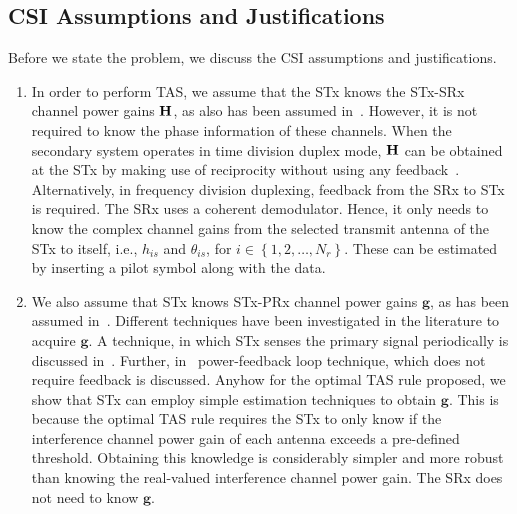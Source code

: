 \documentclass[12pt,draftcls,peerreview,onecolumn]{IEEEtran}
\newcommand{\ie}{{i.e.}}
\newcommand{\mtx}[1]{{\bf #1}} %
\newcommand{\Nr}{{N_r}}
\newcommand{\such}{h}
\newcommand{\puch}{g}
\newcommand{\hk}[1]{{\such_{#1}}}
\newcommand{\g}{\mathbf{\puch}}
\newcommand{\nropts}{\left\{1,2,\ldots,\Nr\right\}}
\newcommand{\suchph}{\theta}
\newcommand{\thetahk}{\suchph_{is}}
\newcommand{\Hmx}{\mtx{H}}
\begin{document}
\subsection{CSI Assumptions and Justifications}  
Before we state the problem, we discuss the  CSI assumptions and justifications. 
\begin{enumerate}
\item In order to perform TAS, we assume that the STx knows the STx-SRx channel power gains $\Hmx$, as also has been assumed in~\cite{XKang_2011_JSAC,Hanif_2015_globecom,Sarvendranath_2013_TCOM,Kong_2011_JCN,Asaduzzaman_2010_IET,Kang_2008_ICC,Wang_2010_TWC,RZhang_2009_TWC}. However, it is not required to know the phase information of these channels. When the secondary system operates in time division duplex mode, $\Hmx$ can be obtained at the STx by making use of reciprocity without using any feedback~\cite{Sarvendranath_2013_TCOM}. Alternatively, in frequency division duplexing, feedback from the SRx to STx is required. The SRx uses a coherent demodulator. Hence, it only needs to know the complex channel gains from the selected transmit antenna of the STx to itself, \ie, $\hk{is}$ and $\thetahk$, for $i\in\nropts$. These can be estimated by inserting a pilot symbol along with the data. 

\item We also assume that STx knows STx-PRx channel power gains $\g$, as has been assumed in~\cite{Hanif_2015_globecom,Sarvendranath_2013_TCOM,Kong_2011_JCN,Asaduzzaman_2010_IET,Kang_2008_ICC,Wang_2010_TWC,RZhang_2009_TWC}. Different techniques have been investigated in the literature to acquire $\g$. A technique, in which STx senses the primary signal periodically is discussed in~\cite{Zhao_2008_TSP}. Further, in~\cite{RZhang_2008_DSAN} power-feedback loop technique, which does not require feedback is discussed. Anyhow for the optimal TAS rule proposed, we show that STx can employ simple estimation techniques to obtain $\g$. This is because the optimal TAS rule requires the STx to only know if the interference channel power gain of each antenna exceeds a pre-defined threshold. Obtaining this knowledge is considerably simpler and more robust than knowing the real-valued interference channel power gain. The SRx does not need to know $\g$. 
\end{enumerate}
\end{document}
